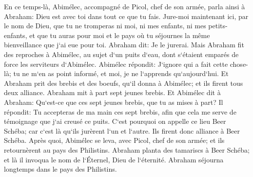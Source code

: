 \verse En ce temps-là, Abimélec, accompagné de Picol, chef de son armée, parla ainsi à Abraham: Dieu est avec toi dans tout ce que tu fais. 
\verse Jure-moi maintenant ici, par le nom de Dieu, que tu ne tromperas ni moi, ni mes enfants, ni mes petits-enfants, et que tu auras pour moi et le pays où tu séjournes la même bienveillance que j`ai eue pour toi. 
\verse Abraham dit: Je le jurerai. 
\verse Mais Abraham fit des reproches à Abimélec, au sujet d`un puits d`eau, dont s`étaient emparés de force les serviteurs d`Abimélec. 
\verse Abimélec répondit: J`ignore qui a fait cette chose-là; tu ne m`en as point informé, et moi, je ne l`apprends qu`aujourd`hui. 
\verse Et Abraham prit des brebis et des boeufs, qu`il donna à Abimélec; et ils firent tous deux alliance. 
\verse Abraham mit à part sept jeunes brebis. 
\verse Et Abimélec dit à Abraham: Qu`est-ce que ces sept jeunes brebis, que tu as mises à part? 
\verse Il répondit: Tu accepteras de ma main ces sept brebis, afin que cela me serve de témoignage que j`ai creusé ce puits. 
\verse C`est pourquoi on appelle ce lieu Beer Schéba; car c`est là qu`ils jurèrent l`un et l`autre. 
\verse Ils firent donc alliance à Beer Schéba. Après quoi, Abimélec se leva, avec Picol, chef de son armée; et ils retournèrent au pays des Philistins. 
\verse Abraham planta des tamariscs à Beer Schéba; et là il invoqua le nom de l`Éternel, Dieu de l`éternité. 
\verse Abraham séjourna longtemps dans le pays des Philistins. 

